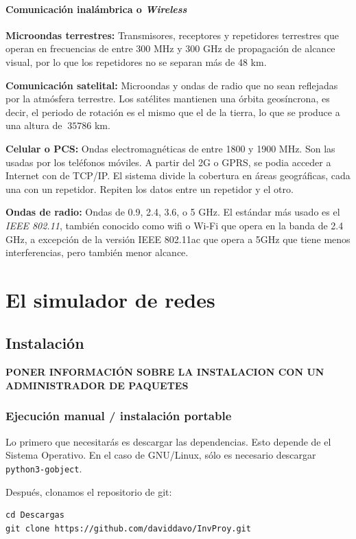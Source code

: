 \documentclass[a4paper, 11pt]{report} %
\begin{document}
\subsubsection{Comunicación inalámbrica o \textit{Wireless}}
\begin{description}
\item \textbf{Microondas terrestres:} Transmisores, receptores y repetidores terrestres que operan en frecuencias de entre 300 MHz y 300 GHz de propagación de alcance visual, por lo que los repetidores no se separan más de 48 km.
\item \textbf{Comunicación satelital:} Microondas y ondas de radio que no sean reflejadas por la atmósfera terrestre. Los satélites mantienen una órbita geosíncrona, es decir, el periodo de rotación es el mismo que el de la tierra, lo que se produce a una altura de $~35786$ km.
\item \textbf{Celular o PCS:} Ondas electromagnéticas de entre 1800 y 1900 MHz. Son las usadas por los teléfonos móviles. A partir del 2G o GPRS, se podia acceder a Internet con de TCP/IP. El sistema divide la cobertura en áreas geográficas, cada una con un repetidor. Repiten los datos entre un repetidor y el otro.
\item \textbf{Ondas de radio:} Ondas de 0.9, 2.4, 3.6, o 5 GHz. El estándar más usado es el \textit{IEEE 802.11}, también conocido como wifi o Wi-Fi que opera en la banda de 2.4 GHz, a excepción de la versión IEEE 802.11ac que opera a 5GHz que tiene menos interferencias, pero también menor alcance.
\end{description}

\chapter{El simulador de redes}
\section{Instalación}
\textbf{PONER INFORMACIÓN SOBRE LA INSTALACION CON UN ADMINISTRADOR DE PAQUETES}
\subsection{Ejecución manual / instalación portable}
Lo primero que necesitarás es descargar las dependencias. Esto depende de el Sistema Operativo. En el caso de GNU/Linux, sólo es necesario descargar \texttt{python3-gobject}. 

Después, clonamos el repositorio de git:
\begin{verbatim}
cd Descargas
git clone https://github.com/daviddavo/InvProy.git
\end{verbatim}
\end{document}
